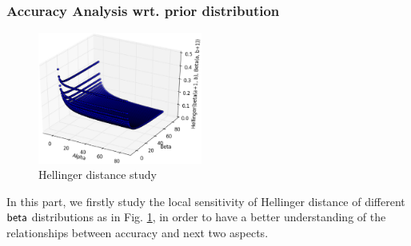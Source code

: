 \documentclass[sigconf]{acmart}
\begin{document}
\begin{itemize}
\begin{itemize}


	\end{itemize}  

\end{itemize}
\subsubsection{Accuracy Analysis wrt. prior distribution}

\begin{figure}[ht]
\centering
\includegraphics[width=0.48\textwidth]{sensitivity}
\caption{Hellinger distance study}
\label{fig_sensitivity}
\end{figure}
In this part, we firstly study the local sensitivity of Hellinger distance of different $\mathsf{beta}$ distributions as in Fig. \ref{fig_sensitivity}, in order to have a better understanding of the relationships between accuracy and next two aspects.
\end{document}
